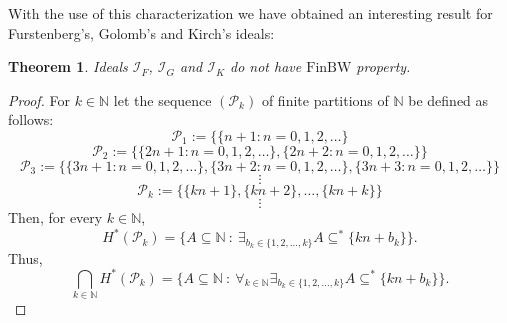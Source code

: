 \documentclass{amsart}
\newtheorem{thm}{Theorem}
\theoremstyle{definition}
\theoremstyle{definition}
\newcommand{\N}{{\mathbb N}}
\newcommand{\I}{\mathcal I}
\newcommand{\finbw}{\text{FinBW}}
\DeclareMathOperator{\Exists}{\exists}
\DeclareMathOperator{\Forall}{\forall}
\begin{document}
With the use of this characterization we have obtained an interesting result for Furstenberg's, Golomb's and Kirch's ideals: 

\begin{thm}
Ideals $\I_F$, $\I_G$ and $\I_K$ do not have $\finbw$ property.
\end{thm}

\begin{proof}
For $k\in\N$ 
let the sequence $(\mathcal{P}_k)$ of finite partitions of $\N$ be defined as follows:\\
$$\mathcal{P}_1 := \{\{n+1\colon n = 0,1,2,\ldots\}$$
$$\mathcal{P}_2 := \{\{2n+1\colon n = 0,1,2,\ldots\},
 \{2n+2\colon n = 0,1,2,\ldots\}\}$$
$$\mathcal{P}_3 := \{\{3n+1\colon n = 0,1,2,\ldots\},
 \{3n+2\colon n = 0,1,2,\ldots\}, \{3n+3\colon n = 0,1,2,\ldots\}\}$$
$$\vdots$$
$$\mathcal{P}_k := \{\{kn+1\}, \{kn+2\}, \ldots, \{kn+k\}\}$$
$$\vdots$$
Then, for every $k\in\N$, 
$$H^{*}(\mathcal{P}_k)= \{A\subseteq\N \ :\ \Exists_{b_k\in\{1,2,\ldots,k\}} A\subseteq^* \{kn+b_k\}\}.$$
Thus,
$$\bigcap_{k\in\N} H^{*}(\mathcal{P}_k)= \{A\subseteq\N \ :\ \Forall_{k\in\N}\Exists_{b_k\in\{1,2,\ldots,k\}} A\subseteq^* \{kn+b_k\}\}.$$


\end{proof}
\end{document}
